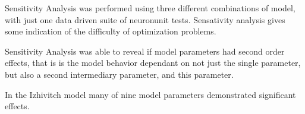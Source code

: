 Sensitivity Analysis was performed using three different combinations of model, with just one data driven suite of neuronunit tests. Sensativity analysis gives some indication of the difficulty of optimization problems.

Sensitivity Analysis was able to reveal if model parameters had second order effects, that is is the model behavior dependant on not just the single parameter, but also a second intermediary parameter, and this parameter. 

In the Izhivitch model many of nine model parameters demonstrated significant effects.